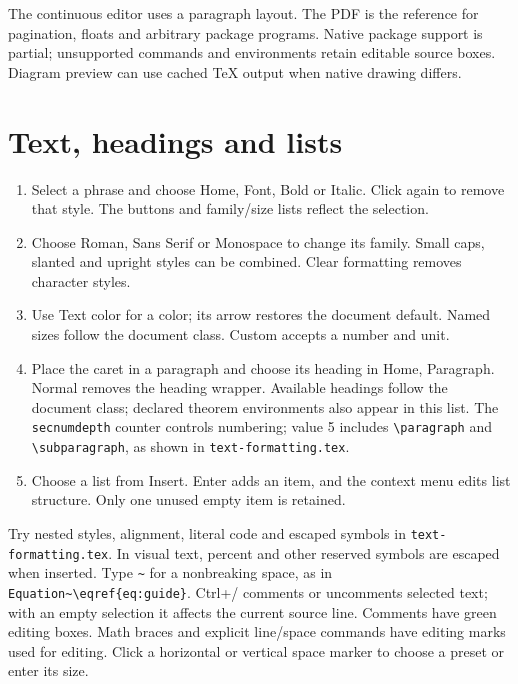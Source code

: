 \documentclass[11pt]{article}
\begin{document}
The continuous editor uses a paragraph layout. The PDF is the
reference for pagination, floats and arbitrary package programs. Native package
support is partial; unsupported commands and environments retain editable source
boxes. Diagram preview can use cached \TeX{} output when native drawing differs.

\section{Text, headings and lists}
\begin{enumerate}
\item Select a phrase and choose Home, Font, Bold or Italic. Click again to remove
that style. The buttons and family/size lists reflect the selection.
\item Choose Roman, Sans Serif or Monospace to change its family. Small caps,
slanted and upright styles can be combined. Clear formatting removes character styles.
\item Use Text color for a color; its arrow restores the document default.
Named sizes follow the document class. Custom accepts a number and unit.
\item Place the caret in a paragraph and choose its heading in Home, Paragraph.
Normal removes the heading wrapper. Available headings follow the document class;
declared theorem environments also appear in this list.
The \texttt{secnumdepth} counter controls numbering; value 5 includes
\verb|\paragraph| and \verb|\subparagraph|, as shown in \texttt{text-formatting.tex}.
\item Choose a list from Insert. Enter adds an item, and the context menu edits
list structure. Only one unused empty item is retained.
\end{enumerate}

Try nested styles, alignment, literal code and escaped symbols in
\texttt{text-formatting.tex}. In visual text, percent and other reserved symbols
are escaped when inserted. Type \verb|~| for a nonbreaking space, as in
\verb|Equation~\eqref{eq:guide}|. Ctrl+/ comments or uncomments selected text;
with an empty selection it affects the current source line. Comments have green
editing boxes. Math braces and explicit line/space commands have editing marks
used for editing. Click a horizontal or vertical space marker to
choose a preset or enter its size.
\end{document}
